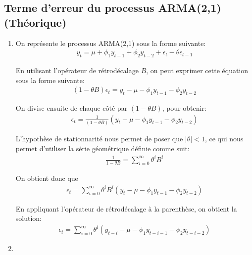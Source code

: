 \documentclass{article}
\begin{document}
\clearpage
\subsection{Terme d'erreur du processus ARMA(2,1) (Théorique)}

\begin{enumerate}
\item
  On représente le processus ARMA(2,1) sous la forme suivante:
  \begin{align*}
    y_t = \mu + \phi_1 y_{t-1} + \phi_2 y_{t-2} + \epsilon_t - \theta\epsilon_{t-1}
  \end{align*}
  
  En utilisant l'opérateur de rétrodécalage $B$, on peut exprimer cette équation sous la forme suivante:
  \begin{align*}
    (1-\theta B)\epsilon_t = y_t - \mu - \phi_1 y_{t-1} - \phi_2 y_{t-2}
  \end{align*}
  
  On divise ensuite de chaque côté par $(1-\theta B)$, pour obtenir:
  \begin{align*}
    \epsilon_t = \frac{1}{(1-\theta B)} \left(y_t - \mu - \phi_1 y_{t-1} - \phi_2 y_{t-2}\right)
  \end{align*}
  
  L'hypothèse de stationnarité nous permet de poser que $| \theta | < 1$, ce qui nous permet d'utiliser la série géométrique définie comme suit:
  \begin{align*}
    \frac{1}{1-\theta B} = \sum_{i=0}^{\infty} \theta^i B^i
  \end{align*}
  
  On obtient donc que 
  \begin{align*}
    \epsilon_t = \sum_{i=0}^{\infty} \theta^i B^i \left(y_t - \mu - \phi_1 y_{t-1} - \phi_2 y_{t-2}\right)
  \end{align*}
  
  En appliquant l'opérateur de rétrodécalage à la parenthèse, on obtient la solution:
  \begin{align*}
    \epsilon_t = \sum_{i=0}^{\infty} \theta^i \left(y_{t-i} - \mu - \phi_1 y_{t-i-1} - \phi_2 y_{t-i-2} \right)
  \end{align*}

\item
  

\end{enumerate}
\end{document}
